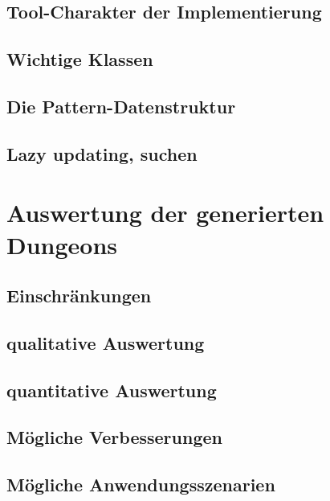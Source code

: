 
\section{Tool-Charakter der Implementierung}

\section{Wichtige Klassen}


\section{Die Pattern-Datenstruktur}

\section{Lazy updating, suchen}


\chapter{Auswertung der generierten Dungeons}

\section{Einschränkungen}


\section{qualitative Auswertung}

\section{quantitative Auswertung}

\section{Mögliche Verbesserungen}\label{s.verbesserungen}

\section{Mögliche Anwendungsszenarien}

